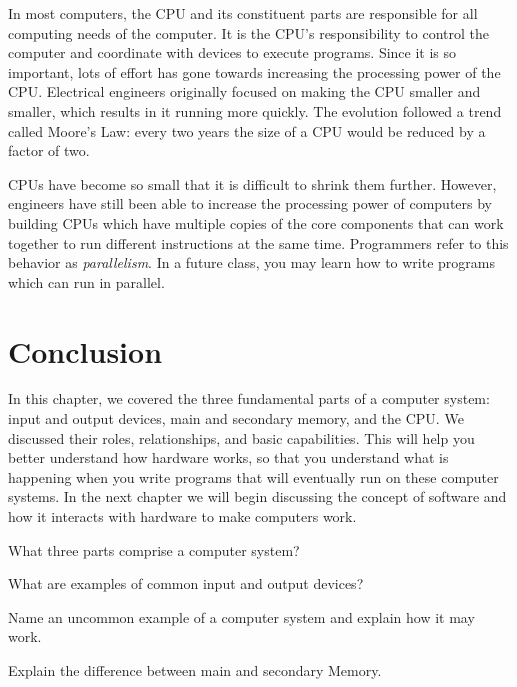 In most computers, the CPU and its constituent parts are responsible for all computing needs of the computer.  It is the CPU's responsibility to control the computer and coordinate with devices to execute programs. Since it is so important, lots of effort has gone towards increasing the processing power of the CPU. Electrical engineers originally focused on making the CPU smaller and smaller, which results in it running more quickly. The evolution followed a trend called Moore's Law: every two years the size of a CPU would be reduced by a factor of two.

CPUs have become so small that it is difficult to shrink them further. However, engineers have still been able to increase the processing power of computers by building CPUs which have multiple copies of the core components that can work together to run different instructions at the same time. Programmers refer to this behavior as \emph{parallelism}. In a future class, you may learn how to write programs which can run in parallel.


\section {Conclusion}

In this chapter, we covered the three fundamental parts of a computer system: input and output devices, main and secondary memory, and the CPU. We discussed their roles, relationships, and basic capabilities. This will help you better understand how hardware works, so that you understand what is happening when you write programs that will eventually run on these computer systems. In the next chapter we will begin discussing the concept of software and how it interacts with hardware to make computers work.

\exercisesection

\begin{exercise}
What three parts comprise a computer system?
\end{exercise}

\begin{exercise}
What are examples of common input and output devices?
\end{exercise}

\begin{exercise}
Name an uncommon example of a computer system and explain how it may work.
\end{exercise}

\begin{exercise}
Explain the difference between main and secondary Memory.
\end{exercise}
